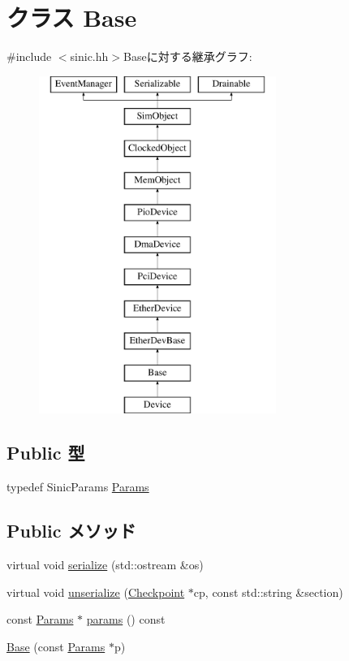 \hypertarget{classSinic_1_1Base}{
\section{クラス Base}
\label{classSinic_1_1Base}
}


{\ttfamily \#include $<$sinic.hh$>$}Baseに対する継承グラフ:\begin{figure}[H]
\begin{center}
\leavevmode
\includegraphics[height=11cm]{classSinic_1_1Base}
\end{center}
\end{figure}
\subsection*{Public 型}
\begin{DoxyCompactItemize}
\item 
typedef SinicParams \hyperlink{classSinic_1_1Base_ae32fbee6dea75ffbb01b7d869c7bedad}{Params}
\end{DoxyCompactItemize}
\subsection*{Public メソッド}
\begin{DoxyCompactItemize}
\item 
virtual void \hyperlink{classSinic_1_1Base_a53e036786d17361be4c7320d39c99b84}{serialize} (std::ostream \&os)
\item 
virtual void \hyperlink{classSinic_1_1Base_af22e5d6d660b97db37003ac61ac4ee49}{unserialize} (\hyperlink{classCheckpoint}{Checkpoint} $\ast$cp, const std::string \&section)
\item 
const \hyperlink{classSinic_1_1Base_ae32fbee6dea75ffbb01b7d869c7bedad}{Params} $\ast$ \hyperlink{classSinic_1_1Base_acd3c3feb78ae7a8f88fe0f110a718dff}{params} () const 
\item 
\hyperlink{classSinic_1_1Base_ae02136eda3d063396056b352cc26f7e6}{Base} (const \hyperlink{classSinic_1_1Base_ae32fbee6dea75ffbb01b7d869c7bedad}{Params} $\ast$p)
\end{DoxyCompactItemize}
